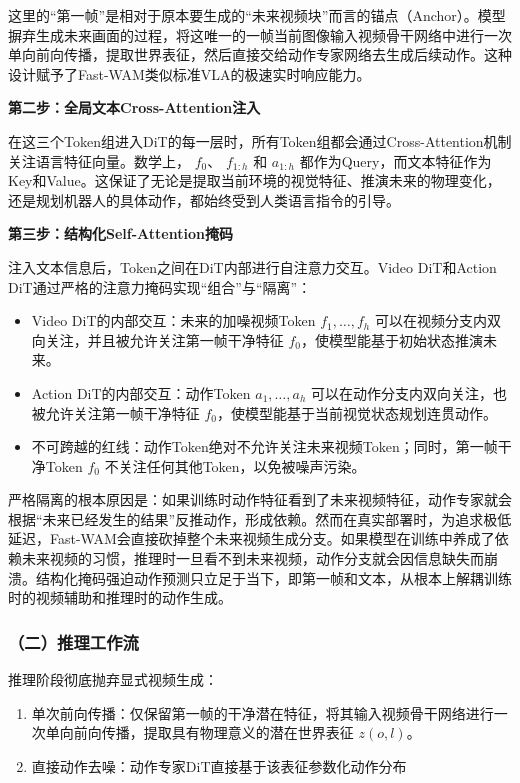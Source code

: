 这里的``第一帧''是相对于原本要生成的``未来视频块''而言的锚点（Anchor）。模型摒弃生成未来画面的过程，将这唯一的一帧当前图像输入视频骨干网络中进行一次单向前向传播，提取世界表征，然后直接交给动作专家网络去生成后续动作。这种设计赋予了Fast-WAM类似标准VLA的极速实时响应能力。

\textbf{第二步：全局文本Cross-Attention注入}

在这三个Token组进入DiT的每一层时，所有Token组都会通过Cross-Attention机制关注语言特征向量。数学上， \(f_0\)、 \(f_{1:h}\) 和 \(a_{1:h}\) 都作为Query，而文本特征作为Key和Value。这保证了无论是提取当前环境的视觉特征、推演未来的物理变化，还是规划机器人的具体动作，都始终受到人类语言指令的引导。

\textbf{第三步：结构化Self-Attention掩码}

注入文本信息后，Token之间在DiT内部进行自注意力交互。Video DiT和Action DiT通过严格的注意力掩码实现``组合''与``隔离''：

\begin{itemize}
\tightlist
\item
  Video DiT的内部交互：未来的加噪视频Token \(f_1,\ldots,f_h\) 可以在视频分支内双向关注，并且被允许关注第一帧干净特征 \(f_0\)，使模型能基于初始状态推演未来。
\item
  Action DiT的内部交互：动作Token \(a_1,\ldots,a_h\) 可以在动作分支内双向关注，也被允许关注第一帧干净特征 \(f_0\)，使模型能基于当前视觉状态规划连贯动作。
\item
  不可跨越的红线：动作Token绝对不允许关注未来视频Token；同时，第一帧干净Token \(f_0\) 不关注任何其他Token，以免被噪声污染。
\end{itemize}

严格隔离的根本原因是：如果训练时动作特征看到了未来视频特征，动作专家就会根据``未来已经发生的结果''反推动作，形成依赖。然而在真实部署时，为追求极低延迟，Fast-WAM会直接砍掉整个未来视频生成分支。如果模型在训练中养成了依赖未来视频的习惯，推理时一旦看不到未来视频，动作分支就会因信息缺失而崩溃。结构化掩码强迫动作预测只立足于当下，即第一帧和文本，从根本上解耦训练时的视频辅助和推理时的动作生成。

\hypertarget{ux4e8cux63a8ux7406ux5de5ux4f5cux6d41}{%
\subsubsection{（二）推理工作流}\label{ux4e8cux63a8ux7406ux5de5ux4f5cux6d41}}

推理阶段彻底抛弃显式视频生成：

\begin{enumerate}
\def\labelenumi{\arabic{enumi}.}
\tightlist
\item
  单次前向传播：仅保留第一帧的干净潜在特征，将其输入视频骨干网络进行一次单向前向传播，提取具有物理意义的潜在世界表征 \(z(o,l)\)。
\item
  直接动作去噪：动作专家DiT直接基于该表征参数化动作分布
\end{enumerate}


